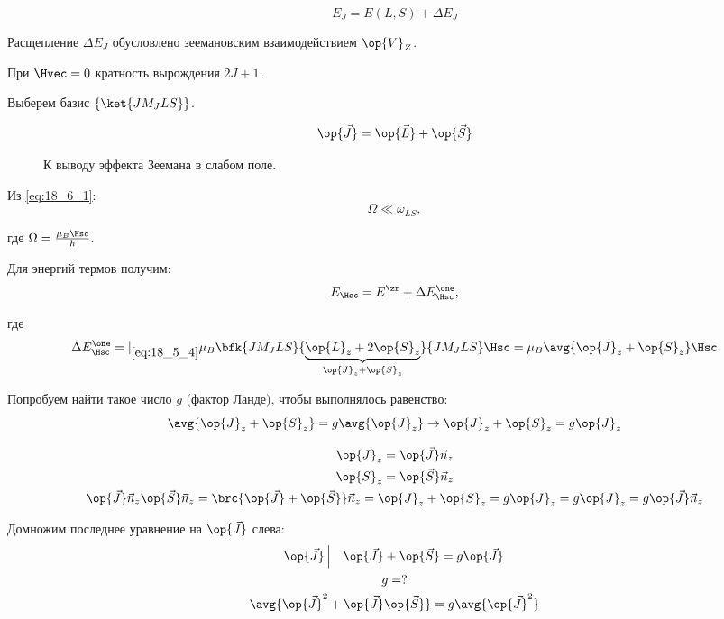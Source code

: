 $$
E_J = E(L, S) + \Delta E_J 
$$

Расщепление $\Delta E_J$ обусловлено зеемановским взаимодействием $\op{V}_Z$.

При $\Hvec = 0$ кратность вырождения $2J + 1$.

Выберем базис $\{ \ket{J M_J L S}\}$.

$$
\op{\vec{J}} = \op{\vec{L}} +\op{\vec{S}} 
$$

\begin{figure}[h!]
\centering
{}
\caption{К выводу эффекта Зеемана в слабом поле.} \label{fig:18_2}
\end{figure}


Из \eqref{eq:18_6_1}:
\begin{equation}
\label{eq:18_6_2}
\Omega \ll \omega_{LS},
\end{equation}

где $\Omega = \frac{\mu_B \Hsc}{\hbar}$.

Для энергий термов получим:
$$
E_{\Hsc} = E^\zr + \Delta E_{\Hsc}^\one,
$$

где 
$$
\Delta E_{\Hsc}^\one =|_{\eqref{eq:18_5_4}} \mu_B \bfk{J M_J L S}{\underbrace{\op{L}_z + 2\op{S}_z}_{\op{J}_z + \op{S}_z}}{J M_J L S} \Hsc  = \mu_B \avg{\op{J}_z + \op{S}_z} \Hsc
$$

Попробуем найти такое число $g$ (фактор Ланде), чтобы выполнялось равенство:
$$
\avg{\op{J}_z + \op{S}_z} = g\avg{\op{J}_z} \to \op{J}_z + \op{S}_z = g\op{J}_z 
$$

\begin{gather*}
\op{J}_z = \op{\vec{J}} \vec{n}_z \\
\op{S}_z = \op{\vec{S}} \vec{n}_z \\
\op{\vec{J}} \vec{n}_z \op{\vec{S}} \vec{n}_z = \brc{\op{\vec{J}} + \op{\vec{S}}}\vec{n}_z = \op{J}_z + \op{S}_z = g \op{J}_z
 = g \op{J}_z = g \op{\vec{J}} \vec{n}_z
\end{gather*}

Домножим последнее уравнение на $\op{\vec{J}}$ слева:
\begin{gather*}
\op{\vec{J}} \left |~~~ \op{\vec{J}} + \op{\vec{S}} = g\op{\vec{J}} \right . \\
g = ? \\
\avg{\op{\vec{J}}^2 + \op{\vec{J}} \op{\vec{S}}} = g \avg{\op{\vec{J}}^2} \\
\end{gather*}

